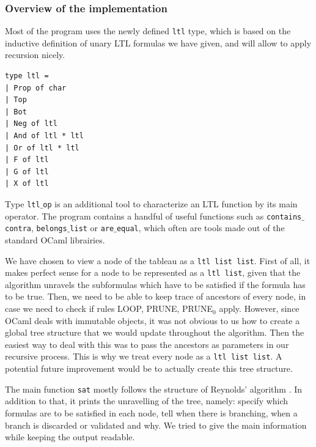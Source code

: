 \documentclass[11pt]{article}
\theoremstyle{definition}
\begin{document}
\subsubsection*{Overview of the implementation}

Most of the program uses the newly defined {\tt ltl} type, which is based on the inductive 
definition of unary LTL formulas we have given, and will allow to apply recursion nicely.

\begin{lstlisting}
type ltl =
| Prop of char
| Top
| Bot
| Neg of ltl
| And of ltl * ltl
| Or of ltl * ltl
| F of ltl
| G of ltl
| X of ltl
\end{lstlisting}

Type {\tt ltl$\_$op} is an additional tool to characterize an LTL function by its main operator.
The program contains a handful of useful functions such as {\tt contains$\_$contra}, {\tt belongs$\_$list}
or {\tt are$\_$equal}, which often are tools made out of the standard OCaml librairies.

We have chosen to view a node of the tableau as a {\tt ltl list list}.
First of all, it makes perfect sense for a
node to be represented as a {\tt ltl list}, given that the algorithm unravels the subformulas which 
have to be satisfied if the formula has to be true. Then, we need to be able to keep trace
of ancestors of every node, in case we need to check if rules LOOP, PRUNE, PRUNE$_0$ apply.
However, since OCaml deals with immutable objects, it was not obvious to us how to create a global tree structure
that we would update throughout the algorithm. Then the easiest way to deal with this was
to pass the ancestors as parameters
in our recursive process. This is why we treat every node as a {\tt ltl list list}. A potential future improvement 
would be to actually create this tree structure.

The main function {\tt sat} mostly
follows the structure of Reynolds' algorithm \cite{ReyLTL}. In addition to that, it prints 
the unravelling of the tree, namely: specify which formulas are to be satisfied 
in each node, tell when there is branching, when a branch is discarded or validated and why.
We tried to give the main information while keeping the output readable.
\end{document}
